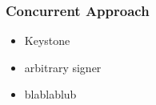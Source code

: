 \begin{frame}
	\frametitle{Concurrent Approach}
	
	\begin{itemize}
		\setlength\itemsep{1em}
		\item Keystone
		\item arbitrary signer
		\item blablablub
	\end{itemize}
\end{frame}